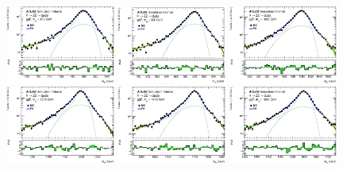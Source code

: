 \begin{figure}[htbp]
    \includegraphics[width=0.32\textwidth]{figures/HMHZZ/signal/ggf_mass_signal_800_H4l_2mu2e.eps}
    \includegraphics[width=0.32\textwidth]{figures/HMHZZ/signal/ggf_mass_signal_900_H4l_2mu2e.eps}
    \includegraphics[width=0.32\textwidth]{figures/HMHZZ/signal/ggf_mass_signal_1000_H4l_2mu2e.eps}\\
    \includegraphics[width=0.32\textwidth]{figures/HMHZZ/signal/ggf_mass_signal_1200_H4l_2mu2e.eps}
    \includegraphics[width=0.32\textwidth]{figures/HMHZZ/signal/ggf_mass_signal_1400_H4l_2mu2e.eps}
    \includegraphics[width=0.32\textwidth]{figures/HMHZZ/signal/ggf_mass_signal_1600_H4l_2mu2e.eps}\\

\end{figure}
